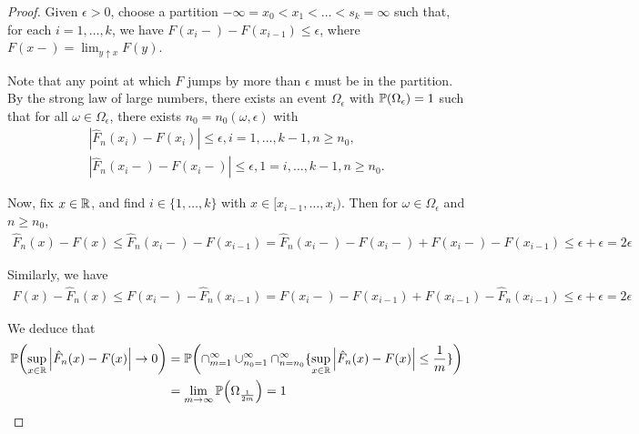 \begin{proof}
  Given $\epsilon > 0$, choose a partition $-\infty = x_{0} < x_{1} <
  \dots < s_{k} = \infty$ such that, for each $i = 1, \dots, k$, we
  have $F(x_{i}-) - F(x_{i-1}) \leq \epsilon$, where $F(x-) = \lim_{y
    \uparrow x} F(y)$.

  Note that any point at which $F$ jumps by more than $\epsilon$ must
  be in the partition.  By the strong law of large numbers, there
  exists an event $\Omega_{\epsilon}$ with $\Prob{\Omega_{\epsilon}} =
  1$ such that for all $\omega \in \Omega_{\epsilon}$, there exists
  $n_{0} = n_{0}(\omega, \epsilon)$ with
  \begin{align}
    \label{eq:3}
    \left| \hat F_{n}(x_{i}) - F(x_{i}) \right| \leq \epsilon, i = 1,
    \dots, k - 1, n \geq n_{0}, \\
    \left| \hat F_{n}(x_{i}-) - F(x_{i}-) \right| \leq \epsilon, 1 =
    i, \dots, k-1, n \geq n_{0}.
  \end{align}

  Now, fix $x \in \mathbb{R}$, and find $i \in \{ 1, \dots, k \}$ with $x \in
  [x_{i-1}, \dots, x_{i})$.  Then for $\omega \in \Omega_{\epsilon}$
  and $n \geq n_{0}$,
  \begin{align}
    \label{eq:4}
    \hat F_{n}(x) - F(x) \leq \hat F_{n}(x_{i}-) - F(x_{i-1}) = \hat
    F_{n}(x_{i}-) - F(x_{i}-) + F(x_{i}-) - F(x_{i-1}) \leq \epsilon +
    \epsilon = 2\epsilon
  \end{align}

  Similarly, we have
  \begin{align}
    \label{eq:5}
    F(x) - \hat F_{n}(x) \leq F(x_{i}-) - \hat F_{n}(x_{i-1}) =
    F(x_{i}-) - F(x_{i-1}) + F(x_{i-1}) - \hat F_{n}(x_{i-1}) \leq
    \epsilon + \epsilon = 2 \epsilon
  \end{align}

  We deduce that
  \begin{align}
    \label{eq:6}
    \Prob{\sup_{x \in \R} \left| \hat F_{n}(x) - F(x) \right|
    \rightarrow 0} &= \Prob{\cap_{m=1}^{\infty} \cup_{n_{0} =
      1}^{\infty} \cap_{n=n_{0}}^{\infty} \{ \sup_{x \in \R} \left|
      \hat F_{n}(x) - F(x) \right| \leq \frac{1}{m} \}} \\
  &= \lim_{m \rightarrow \infty} \Prob{\Omega_{\frac{1}{2m}}} = 1
  \end{align}



\end{proof}




